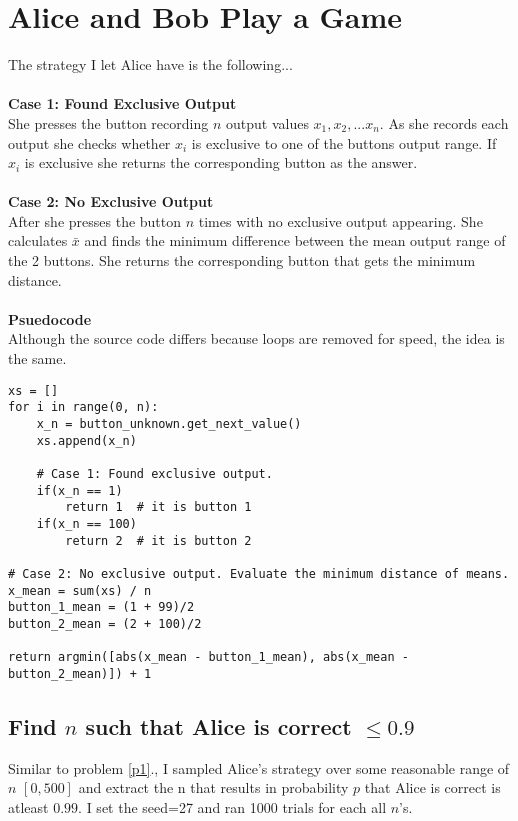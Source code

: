 \documentclass[twocolumn]{article}
\begin{document}
\pagebreak

\section{Alice and Bob Play a Game}
The strategy I let Alice have is the following...
\\\\
\noindent
\textbf{Case 1: Found Exclusive Output}\\
She presses the button recording $n$ output values $x_1, x_2, ... x_n$.
As she records each output she checks whether $x_i$ is exclusive to one of the buttons output range. If $x_i$ is exclusive she returns the corresponding button as the answer.
\\\\
\textbf{Case 2: No Exclusive Output}\\
After she presses the button $n$ times with no exclusive output appearing. She calculates $\bar{x}$ and finds the minimum difference between the mean output range of the 2 buttons. She returns the corresponding button that gets the minimum distance.
\\\\
\textbf{Psuedocode}\\
Although the source code differs because loops are removed for speed, the idea is the same.
\vspace{-4pt}
\begin{lstlisting}
xs = []
for i in range(0, n):	
	x_n = button_unknown.get_next_value()
	xs.append(x_n) 	
	
	# Case 1: Found exclusive output.
	if(x_n == 1)
		return 1  # it is button 1
	if(x_n == 100)
		return 2  # it is button 2
		
# Case 2: No exclusive output. Evaluate the minimum distance of means.
x_mean = sum(xs) / n
button_1_mean = (1 + 99)/2
button_2_mean = (2 + 100)/2

return argmin([abs(x_mean - button_1_mean), abs(x_mean - button_2_mean)]) + 1
\end{lstlisting}

\subsection*{Find $n$ such that Alice is correct $\le 0.9$}
Similar to problem \ref{p1}., I sampled Alice's strategy over some reasonable range of $n$ $[0, 500]$ and extract the n that results in probability $p$ that Alice is correct is atleast $0.99$. I set the seed=27 and  ran 1000 trials for each all $n$'s.
\end{document}
